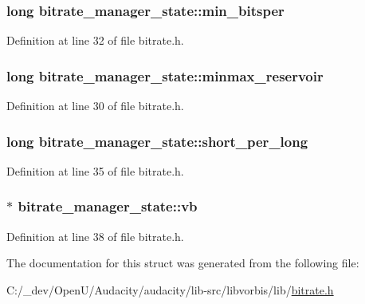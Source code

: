 \subsubsection[{\texorpdfstring{min\+\_\+bitsper}{min_bitsper}}]{\setlength{\rightskip}{0pt plus 5cm}long bitrate\+\_\+manager\+\_\+state\+::min\+\_\+bitsper}\hypertarget{structbitrate__manager__state_aa854e0d6bcb60dc3cf27dd5190c70345}{}\label{structbitrate__manager__state_aa854e0d6bcb60dc3cf27dd5190c70345}


Definition at line 32 of file bitrate.\+h.

\subsubsection[{\texorpdfstring{minmax\+\_\+reservoir}{minmax_reservoir}}]{\setlength{\rightskip}{0pt plus 5cm}long bitrate\+\_\+manager\+\_\+state\+::minmax\+\_\+reservoir}\hypertarget{structbitrate__manager__state_a16a7b9cb7bcc4f9d86efef9fda083fb9}{}\label{structbitrate__manager__state_a16a7b9cb7bcc4f9d86efef9fda083fb9}


Definition at line 30 of file bitrate.\+h.

\subsubsection[{\texorpdfstring{short\+\_\+per\+\_\+long}{short_per_long}}]{\setlength{\rightskip}{0pt plus 5cm}long bitrate\+\_\+manager\+\_\+state\+::short\+\_\+per\+\_\+long}\hypertarget{structbitrate__manager__state_a0d147df96a556b32fe5ff84d3d3b8e8f}{}\label{structbitrate__manager__state_a0d147df96a556b32fe5ff84d3d3b8e8f}


Definition at line 35 of file bitrate.\+h.

\subsubsection[{\texorpdfstring{vb}{vb}}]{$\ast$ bitrate\+\_\+manager\+\_\+state\+::vb}\hypertarget{structbitrate__manager__state_a79de5ce8aa30385d2b9d1c0639ef9c68}{}\label{structbitrate__manager__state_a79de5ce8aa30385d2b9d1c0639ef9c68}


Definition at line 38 of file bitrate.\+h.



The documentation for this struct was generated from the following file\+:\begin{DoxyCompactItemize}
\item 
C\+:/\+\_\+dev/\+Open\+U/\+Audacity/audacity/lib-\/src/libvorbis/lib/\hyperlink{bitrate_8h}{bitrate.\+h}\end{DoxyCompactItemize}
